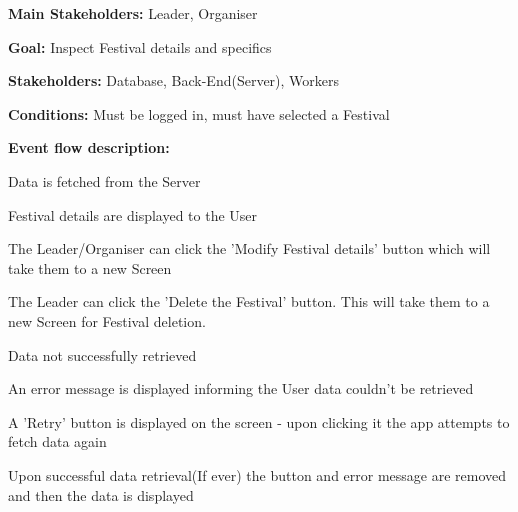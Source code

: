 				\noindent {}
				\begin{packed_item}
					\item \textbf{Main Stakeholders:} Leader, Organiser
					\item \textbf{Goal:} Inspect Festival details and specifics
					\item \textbf{Stakeholders: } Database, Back-End(Server), Workers
					\item \textbf{Conditions: } Must be logged in, must have selected a Festival
					\item \textbf{Event flow description: }
					\begin{packed_enum}
						\item Data is fetched from the Server
						\item Festival details are displayed to the User
						\item The Leader/Organiser can click the 'Modify Festival details' button which will take them to a new Screen
						\item The Leader can click the 'Delete the Festival' button. This will take them to a new Screen for Festival deletion.
					\end{packed_enum}
				
					\begin{packed_item}
						\item[1.a] Data not successfully retrieved
						\item[] \begin{packed_enum}
							\item An error message is displayed informing the User data couldn't be retrieved
							\item A 'Retry' button is displayed on the screen - upon clicking it the app attempts to fetch data again
							\item Upon successful data retrieval(If ever) the button and error message are removed and then the data is displayed
						\end{packed_enum}
					\end{packed_item}
				\end{packed_item}

